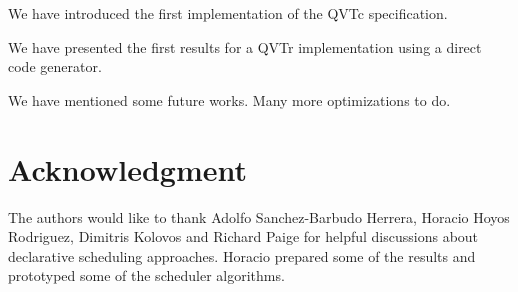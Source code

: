 \documentclass[conference]{IEEEtran}
\begin{document}
We have introduced the first implementation of the QVTc specification.

We have presented the first results for a QVTr implementation using a direct code generator.

We have mentioned some future works. Many more optimizations to do.





\section*{Acknowledgment}

The authors would like to thank Adolfo Sanchez-Barbudo Herrera, Horacio Hoyos Rodriguez, Dimitris Kolovos and Richard Paige for helpful discussions about declarative scheduling approaches. Horacio prepared some of the results and prototyped some of the scheduler algorithms.


\end{document}
